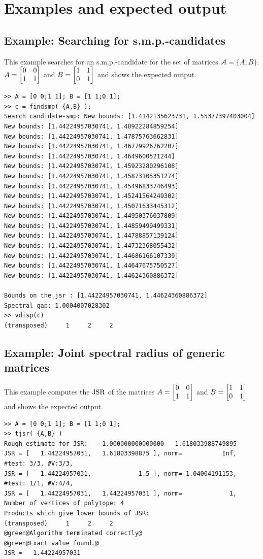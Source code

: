

\chapter{Examples and expected output}

\section{Example: Searching for s.m.p.-candidates}
This example searches for an s.m.p.-candidate for the set of matrices
$\mathcal{A}=\{A,B\}$.
$A=\tbmatrix{0&0\\1&1}$ and $B=\tbmatrix{1&1\\0&1}$
and shows the expected output.
{\small%
\begin{lstlisting}[style=base]
>> A = [0 0;1 1]; B = [1 1;0 1];
>> c = findsmp( {A,B} );
Search candidate-smp: New bounds: [1.4142135623731, 1.55377397403004]
New bounds: [1.44224957030741, 1.48922284859254]
New bounds: [1.44224957030741, 1.47875763662831]
New bounds: [1.44224957030741, 1.46779926762207]
New bounds: [1.44224957030741, 1.4649600521244]
New bounds: [1.44224957030741, 1.45923280296108]
New bounds: [1.44224957030741, 1.45873105351274]
New bounds: [1.44224957030741, 1.45496833746493]
New bounds: [1.44224957030741, 1.45241564249302]
New bounds: [1.44224957030741, 1.45071633445312]
New bounds: [1.44224957030741, 1.44950376037809]
New bounds: [1.44224957030741, 1.44859499499331]
New bounds: [1.44224957030741, 1.44788857139124]
New bounds: [1.44224957030741, 1.44732368055432]
New bounds: [1.44224957030741, 1.44686166107339]
New bounds: [1.44224957030741, 1.44647675750527]
New bounds: [1.44224957030741, 1.44624360886372]

Bounds on the jsr : [1.44224957030741, 1.44624360886372]
Spectral gap: 1.0004007028302
>> vdisp(c)
(transposed)     1     2     2
\end{lstlisting}%
}


\section{Example: Joint spectral radius of generic matrices}
This example computes the $\JSR$ of the matrices 
$A=\tbmatrix{0&0\\1&1}$ and $B=\tbmatrix{1&1\\0&1}$
and shows the expected output.
{\small%
\begin{lstlisting}[style=base]
>> A = [0 0;1 1]; B = [1 1;0 1];
>> tjsr( {A,B} )
Rough estimate for JSR:    1.000000000000000   1.618033988749895
JSR = [   1.44224957031,   1.61803398875 ], norm=           Inf, #test: 3/3, #V:3/3, 
JSR = [   1.44224957031,             1.5 ], norm= 1.04004191153, #test: 1/1, #V:4/4, 
JSR = [   1.44224957031,   1.44224957031 ], norm=             1, 
Number of vertices of polytope: 4
Products which give lower bounds of JSR: 
(transposed)     1     2     2
@green@Algorithm terminated correctly@
@green@Exact value found.@
JSR =   1.44224957031
\end{lstlisting}%
}

